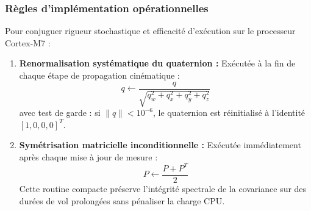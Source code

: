 \documentclass[../Implementation.tex]{subfiles}
\begin{document}
\subsubsection{Règles d'implémentation opérationnelles}
Pour conjuguer rigueur stochastique et efficacité d'exécution sur le processeur Cortex-M7 :
\begin{enumerate}
    \item \textbf{Renormalisation systématique du quaternion :}
    Exécutée à la fin de chaque étape de propagation cinématique :
    \begin{equation}
        q \leftarrow \frac{q}{\sqrt{q_w^2 + q_x^2 + q_y^2 + q_z^2}}
    \end{equation}
    avec test de garde : si $\|q\| < 10^{-6}$, le quaternion est réinitialisé à l'identité $[1, 0, 0, 0]^T$.
    \item \textbf{Symétrisation matricielle inconditionnelle :}
    Exécutée immédiatement après chaque mise à jour de mesure :
    \begin{equation}
        P \leftarrow \frac{P + P^T}{2}
    \end{equation}
    Cette routine compacte préserve l'intégrité spectrale de la covariance sur des durées de vol prolongées sans pénaliser la charge CPU.
\end{enumerate}
\end{document}
